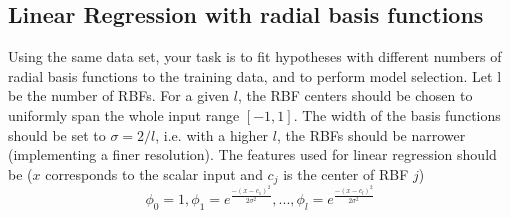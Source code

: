 \documentclass[a4paper]{article}
\begin{document}
\newpage

\subsection{Linear Regression with radial basis functions}
Using the same data set, your task is to fit hypotheses with different numbers of radial basis functions to the
training data, and to perform model selection. Let l be the number of RBFs. For a given $l$, the RBF centers
should be chosen to uniformly span the whole input range $[−1, 1]$. The width of the basis functions should
be set to $\sigma = 2/l$, i.e. with a higher $l$, the RBFs should be narrower (implementing a finer resolution). The
features used for linear regression should be ($x$ corresponds to the scalar input and $c_j$ is the center of RBF
$j$)
\[
\phi_0 = 1, \phi_1 = e^{\frac{-(x-c_1)^2}{2\sigma^2}}, ... , \phi_l = e^{\frac{-(x-c_l)^2}{2\sigma^2}}
\]
\end{document}
